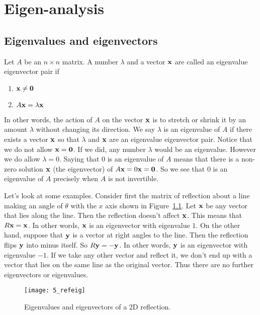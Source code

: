 \chapter{Eigen-analysis}
\label{ch_eig}

\section{Eigenvalues and eigenvectors}

\begin{definition}
Let $A$ be an $n\times n$ matrix. A number $\lambda$ and a vector
${\bf x}$ are called an eigenvalue eigenvector pair if
\begin{enumerate}[(1)]
\item ${\bf x}\ne{\bf 0}$ 
\item $A{\bf x} = \lambda{\bf x}$ 
\end{enumerate}
\end{definition}

In other words, the action of $A$ on the vector ${\bf x}$ is to stretch or
shrink it by an amount $\lambda$ without changing its direction. We
say $\lambda$ is an eigenvalue of $A$ if there exists a vector ${\bf x}$
so that $\lambda$ and ${\bf x}$ are an eigenvalue eigenvector pair.
Notice that we do not allow ${\bf x}={\bf 0}$. If we did, any number $\lambda$
would be an eigenvalue. However we do allow $\lambda=0$. Saying that
$0$ is an eigenvalue of $A$ means that there is a non-zero solution
${\bf x}$ (the eigenvector) of $A{\bf x}=0{\bf x}={\bf 0}$. So we see that $0$ is an
eigenvalue of $A$ precisely when $A$ is not invertible.

Let's look at some examples.  Consider first the matrix of reflection
about a line making an angle of $\theta$ with the $x$ axis shown in
Figure~\ref{fig_refeig}.  Let ${\bf x}$ be any vector that lies along the
line. Then the reflection doesn't affect ${\bf x}$. This means that $R{\bf x}
= {\bf x}$. In other words, ${\bf x}$ is an eigenvector with eigenvalue $1$. On
the other hand, suppose that ${\bf y}$ is a vector at right angles to the
line. Then the reflection flips ${\bf y}$ into minus itself. So
$R{\bf y}=-{\bf y}$.  In other words, ${\bf y}$ is an eigenvector with eigenvalue
$-1$. If we take any other vector and reflect it, we don't end up with
a vector that lies on the same line as the original vector. Thus there
are no further eigenvectors or eigenvalues.

\begin{figure}
\centerline{\texttt{[image: 5\_refeig]}}
\caption{Eigenvalues and eigenvectors of a 2D reflection. 
\label{fig_refeig}}
\end{figure}


